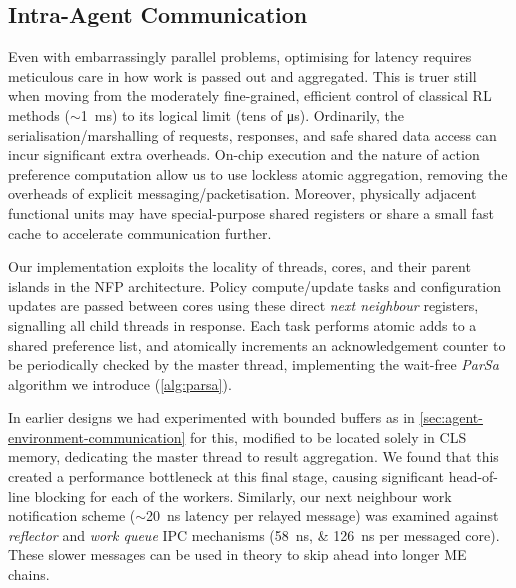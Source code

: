 \documentclass[sigconf,natbib=false]{acmart}
\begin{document}
\subsection{Intra-Agent Communication}\label{sec:intra-agent-communication}
Even with embarrassingly parallel problems, optimising for latency requires meticulous care in how work is passed out and aggregated.
This is truer still when moving from the moderately fine-grained, efficient control of classical RL methods ($\sim$\SI{1}{\milli\second}) to its logical limit (tens of \si{\micro\second}).
Ordinarily, the serialisation/marshalling of requests, responses, and safe shared data access can incur significant extra overheads.
On-chip execution and the nature of action preference computation allow us to use lockless atomic aggregation, removing the overheads of explicit messaging/packetisation.
Moreover, physically adjacent functional units may have special-purpose shared registers or share a small fast cache to accelerate communication further.

Our implementation exploits the locality of threads, cores, and their parent islands in the NFP architecture.
Policy compute/update tasks and configuration updates are passed between cores using these direct \emph{next neighbour} registers, signalling all child threads in response.
Each task performs atomic adds to a shared preference list, and atomically increments an acknowledgement counter to be periodically checked by the master thread, implementing the wait-free \emph{ParSa} algorithm we introduce (\cref{alg:parsa}).

In earlier designs we had experimented with bounded buffers as in \cref{sec:agent-environment-communication} for this, modified to be located solely in CLS memory, dedicating the master thread to result aggregation.
We found that this created a performance bottleneck at this final stage, causing significant head-of-line blocking for each of the workers.
Similarly, our next neighbour work notification scheme ($\sim$\SI{20}{\nano\second} latency per relayed message) was examined against \emph{reflector} and \emph{work queue} IPC mechanisms (\SIlist{58;126}{\nano\second} per messaged core).
These slower messages can be used in theory to skip ahead into longer ME chains.
\end{document}
